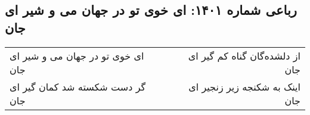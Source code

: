 \begin{center}
\section*{رباعی شماره ۱۴۰۱: ای خوی تو در جهان می و شیر ای جان}
\label{sec:1401}
\begin{longtable}{l p{0.5cm} r}
ای خوی تو در جهان می و شیر ای جان
&&
از دلشده‌گان گناه کم گیر ای جان
\\
گر دست شکسته شد کمان گیر ای جان
&&
اینک به شکنجه زیر زنجیر ای جان
\\
\end{longtable}
\end{center}
